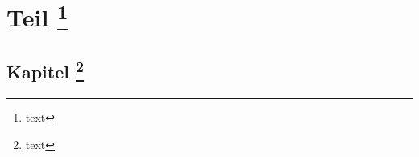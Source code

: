 \documentclass[ngerman,%
cd=full,cdcover=full,%
automark,
cdgeometry=false,
chapterprefix=true,
headings=optiontoheadandtoc,
]{tudscrreprt}
\begin{document}
\tableofcontents

\part{Teil \footnote{text}}
\chapter{Kapitel \footnote{text}}


%
%
\end{document}

